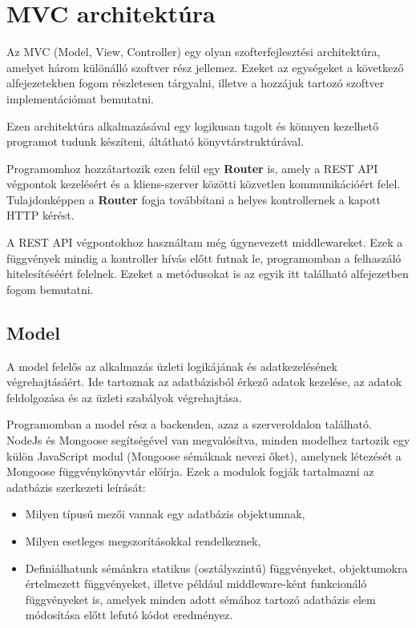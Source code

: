 \pagebreak

\section{MVC architektúra}

\label{ch:mvc}

Az MVC (Model, View, Controller) egy olyan szofterfejlesztési architektúra, amelyet három különálló szoftver rész jellemez. Ezeket az egységeket a következő alfejezetekben fogom részletesen tárgyalni, illetve a hozzájuk tartozó szoftver implementációmat bemutatni.

Ezen architektúra alkalmazásával egy logikusan tagolt és könnyen kezelhető programot tudunk készíteni, áltátható könyvtárstruktúrával.

Programomhoz hozzátartozik ezen felül egy \textbf{Router} is, amely a REST API végpontok kezelésért és a kliens-szerver közötti közvetlen kommunikációért felel. Tulajdonképpen a \textbf{Router} fogja továbbítani a helyes kontrollernek a kapott HTTP kérést.

A REST API végpontokhoz használtam még úgynevezett middlewareket. Ezek a függvények mindig a kontroller hívás előtt futnak le, programomban a felhaszáló hitelesítéséért felelnek. Ezeket a metódusokat is az egyik itt található alfejezetben fogom bemutatni.

\subsection{Model}

A model felelős az alkalmazás üzleti logikájának és adatkezelésének végrehajtásáért. Ide tartoznak az adatbázisból érkező adatok kezelése, az adatok feldolgozása és az üzleti szabályok végrehajtása.

Programomban a model rész a backenden, azaz a szerveroldalon található. NodeJs és Mongoose segítségével van megvalósítva, minden modelhez tartozik egy külön JavaScript modul (Mongoose sémáknak nevezi őket), amelynek létezését a Mongoose függvénykönyvtár előírja. Ezek a modulok fogják tartalmazni az adatbázis szerkezeti leírását:
\begin{itemize}
	\item Milyen típusú mezői vannak egy adatbázis objektumnak,
	\item Milyen esetleges megszorításokkal rendelkeznek,
	\item Definiálhatunk sémánkra statikus (osztályszintű) függvényeket, objektumokra értelmezett függvényeket, illetve például middleware-ként funkcionáló függvényeket is, amelyek minden adott sémához tartozó adatbázis elem módosítása előtt lefutó kódot eredményez.
\end{itemize}

